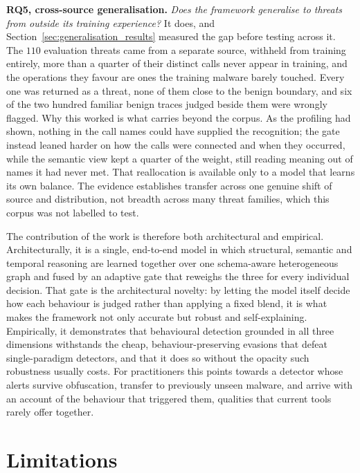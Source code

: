 \documentclass[%
    BCOR=10mm,
    DIV=13,
    toc=bibliography,
    toc=listof,
    oneside,
    12pt,
]{scrbook}
\begin{document}
\textbf{RQ5, cross-source generalisation.} \emph{Does the framework generalise to
threats from outside its training experience?} It does, and
Section~\ref{sec:generalisation_results} measured the gap before testing across it.
The $110$ evaluation threats came from a separate source, withheld from training
entirely, more than a quarter of their distinct calls never appear in training, and
the operations they favour are ones the training malware barely touched. Every one
was returned as a threat, none of them close to the benign boundary, and six of the
two hundred familiar benign traces judged beside them were wrongly flagged. Why this
worked is what carries beyond the corpus. As the profiling had shown, nothing in the
call names could have supplied the recognition; the gate instead leaned harder on how
the calls were connected and when they occurred, while the semantic view kept a
quarter of the weight, still reading meaning out of names it had never met. That
reallocation is available only to a model that learns its own balance. The evidence
establishes transfer across one genuine shift of source and distribution, not breadth
across many threat families, which this corpus was not labelled to test.

The contribution of the work is therefore both architectural and empirical.
Architecturally, it is a single, end-to-end model in which structural, semantic
and temporal reasoning are learned together over one schema-aware heterogeneous
graph and fused by an adaptive gate that reweighs the three for every individual
decision. That gate is the architectural novelty: by letting the model itself decide
how each behaviour is judged rather than applying a fixed blend, it is what makes the
framework not only accurate but robust and self-explaining. Empirically, it demonstrates that behavioural
detection grounded in all three dimensions withstands the cheap, behaviour-preserving
evasions that defeat single-paradigm detectors, and that it does so without the
opacity such robustness usually costs. For practitioners this points towards a
detector whose alerts survive obfuscation, transfer to previously unseen malware, and
arrive with an account of the behaviour that triggered them, qualities that
current tools rarely offer together.

\section{Limitations}
\label{sec:limitations}
\end{document}
